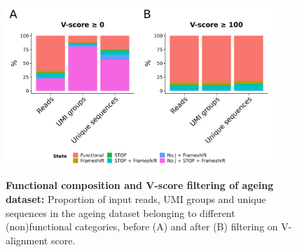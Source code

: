 \begin{figure}
\centering
\includegraphics[width = 0.9\textwidth]{_Figures/png/ageing-functional-prop}
\begin{subfigure}{0em}
\label{fig:igseq-ageing-functional-prop-pre}
\end{subfigure}
\begin{subfigure}{0em}
\label{fig:igseq-ageing-functional-prop-post}
\end{subfigure}
\caption[Functional composition and V-score filtering of \igseq ageing dataset]{\textbf{Functional composition and V-score filtering of \igseq ageing dataset:} Proportion of input reads, UMI groups and unique sequences in the \igseq ageing dataset belonging to different (non)functional categories, before (A) and after (B) filtering on V-alignment score.}

\label{fig:igseq-ageing-functional-prop}
\end{figure}

